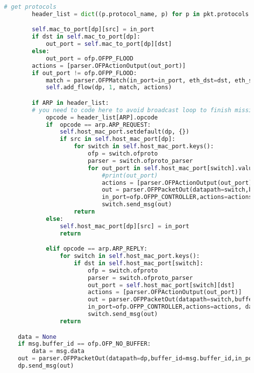 \documentclass{xjtureport}
\begin{document}
\begin{lstlisting}[language=Python]
		# get protocols
		header_list = dict((p.protocol_name, p) for p in pkt.protocols if type(p) != str)

		self.mac_to_port[dp][src] = in_port
		if dst in self.mac_to_port[dp]:
			out_port = self.mac_to_port[dp][dst]
		else:
			out_port = ofp.OFPP_FLOOD
		actions = [parser.OFPActionOutput(out_port)]
		if out_port != ofp.OFPP_FLOOD:
			match = parser.OFPMatch(in_port=in_port, eth_dst=dst, eth_src=src)
			self.add_flow(dp, 1, match, actions)

		if ARP in header_list:
		# you need to code here to avoid broadcast loop to finish mission 2
			opcode = header_list[ARP].opcode
			if  opcode == arp.ARP_REQUEST:
				self.host_mac_port.setdefault(dp, {})
				if src in self.host_mac_port[dp]:
					for switch in self.host_mac_port.keys():
						ofp = switch.ofproto
						parser = switch.ofproto_parser
						for out_port in self.host_mac_port[switch].values():
							#print(out_port)
							actions = [parser.OFPActionOutput(out_port)]
							out = parser.OFPPacketOut(datapath=switch,buffer_id=ofp.OFP_NO_BUFFER,
							in_port=ofp.OFPP_CONTROLLER,actions=actions, data=msg.data)
							switch.send_msg(out)
					return
			else:
				self.host_mac_port[dp][src] = in_port
				return 

			elif opcode == arp.ARP_REPLY:
				for switch in self.host_mac_port.keys():
					if dst in self.host_mac_port[switch]:
						ofp = switch.ofproto
						parser = switch.ofproto_parser
						out_port = self.host_mac_port[switch][dst]
						actions = [parser.OFPActionOutput(out_port)]
						out = parser.OFPPacketOut(datapath=switch,buffer_id=ofp.OFP_NO_BUFFER,
						in_port=ofp.OFPP_CONTROLLER,actions=actions, data=msg.data)
						switch.send_msg(out)
				return

	data = None
	if msg.buffer_id == ofp.OFP_NO_BUFFER:
		data = msg.data
	out = parser.OFPPacketOut(datapath=dp,buffer_id=msg.buffer_id,in_port=in_port, actions=actions, data=data)
	dp.send_msg(out)	
\end{lstlisting}
\end{document}
